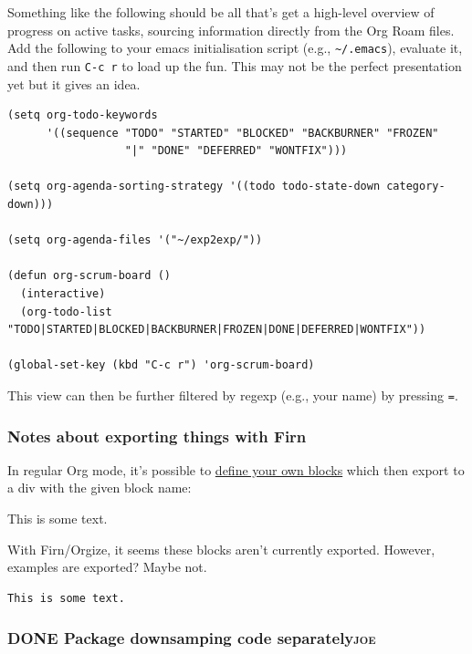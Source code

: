 \documentclass[11pt]{article}
\begin{document}
Something like the following should be all that’s get a high-level
overview of progress on active tasks, sourcing information directly
from the Org Roam files.  Add the following to your emacs
initialisation script (e.g., \texttt{\textasciitilde{}/.emacs}), evaluate it, and then run
\texttt{C-c r} to load up the fun.  This may not be the perfect presentation
yet but it gives an idea.

\begin{verbatim}
(setq org-todo-keywords
      '((sequence "TODO" "STARTED" "BLOCKED" "BACKBURNER" "FROZEN"
                  "|" "DONE" "DEFERRED" "WONTFIX")))

(setq org-agenda-sorting-strategy '((todo todo-state-down category-down)))

(setq org-agenda-files '("~/exp2exp/"))

(defun org-scrum-board ()
  (interactive)
  (org-todo-list "TODO|STARTED|BLOCKED|BACKBURNER|FROZEN|DONE|DEFERRED|WONTFIX"))

(global-set-key (kbd "C-c r") 'org-scrum-board)
\end{verbatim}

This view can then be further filtered by regexp (e.g., your name) by
pressing \texttt{=}.

\subsubsection{Notes about exporting things with Firn}
\label{sec:org4c7c0e2}

In regular Org mode, it’s possible to \href{https://superuser.com/questions/726201/how-can-i-apply-easy-formatting-to-org-mode-blocks}{define your own blocks} which
then export to a div with the given block name:

\begin{monoblock}
This is some text.
\end{monoblock}

With Firn/Orgize, it seems these blocks aren’t currently exported.
However, examples are exported?  Maybe not.

\begin{verbatim}
This is some text.
\end{verbatim}

\subsubsection{{\bfseries\sffamily DONE} Package downsamping code separately\hfill{}\textsc{joe}}
\label{sec:orgc219a7c}
\end{document}
